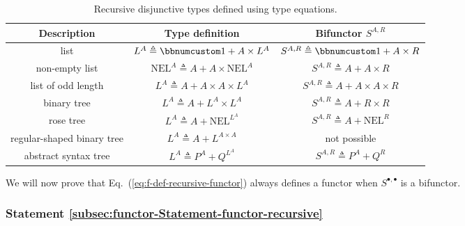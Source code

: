 \begin{table}
\begin{centering}
\begin{tabular}{|c|c|c|}
\hline 
\textbf{\small{}Description} & \textbf{\small{}Type definition} & \textbf{\small{}Bifunctor $S^{A,R}$}\tabularnewline
\hline 
\hline 
{\small{}list} & {\small{}$L^{A}\triangleq\bbnum 1+A\times L^{A}$} & {\small{}$S^{A,R}\triangleq\bbnum 1+A\times R$}\tabularnewline
\hline 
{\small{}non-empty list} & {\small{}$\text{NEL}^{A}\triangleq A+A\times\text{NEL}^{A}$} & {\small{}$S^{A,R}\triangleq A+A\times R$}\tabularnewline
\hline 
{\small{}list of odd length} & {\small{}$L^{A}\triangleq A+A\times A\times L^{A}$} & {\small{}$S^{A,R}\triangleq A+A\times A\times R$}\tabularnewline
\hline 
{\small{}binary tree} & {\small{}$L^{A}\triangleq A+L^{A}\times L^{A}$} & {\small{}$S^{A,R}\triangleq A+R\times R$}\tabularnewline
\hline 
{\small{}rose tree} & {\small{}$L^{A}\triangleq A+\text{NEL}^{L^{A}}$} & {\small{}$S^{A,R}\triangleq A+\text{NEL}^{R}$}\tabularnewline
\hline 
{\small{}regular-shaped binary tree} & {\small{}$L^{A}\triangleq A+L^{A\times A}$} & {\small{}not possible}\tabularnewline
\hline 
{\small{}abstract syntax tree} & {\small{}$L^{A}\triangleq P^{A}+Q^{L^{A}}$} & {\small{}$S^{A,R}\triangleq P^{A}+Q^{R}$}\tabularnewline
\hline 
\end{tabular}
\par\end{centering}
\caption{Recursive disjunctive types defined using type equations.\label{tab:Examples-of-recursive-disjunctive-type-equations}}
\end{table}

We will now prove that Eq.~(\ref{eq:f-def-recursive-functor}) always
defines a functor when $S^{\bullet,\bullet}$ is a bifunctor.

\subsubsection{Statement \label{subsec:functor-Statement-functor-recursive}\ref{subsec:functor-Statement-functor-recursive}}

